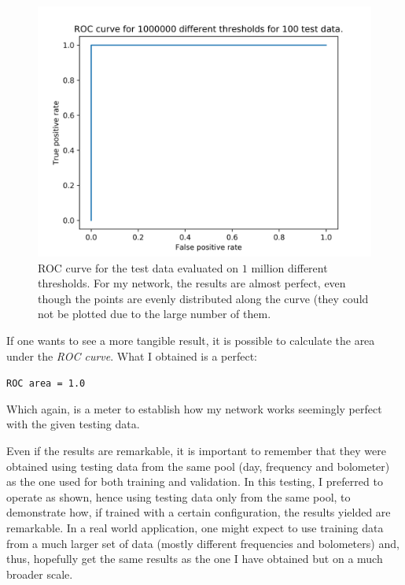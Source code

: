 \documentclass[12pt,a4paper,final]{book}			%
\begin{document}
				\begin{figure}[h!]
				\centering
					\includegraphics[scale=0.8]{figures/ROC.png}
					\caption{ROC curve for the test data evaluated on $1$ million different thresholds. For my network, the results are almost perfect, even though the points are evenly distributed along the curve (they could not be plotted due to the large number of them.}
					\label{fig:roc_curve}
				\end{figure}							
					 
				If one wants to see a more tangible result, it is possible to calculate the area under the \textit{ROC curve}. What I obtained is a perfect:
				\begin{center}
					\texttt{ROC area = 1.0}
				\end{center}
				Which again, is a meter to establish how my network works seemingly perfect with the given testing data.				
				
				Even if the results are remarkable, it is important to remember that they were obtained using testing data from the same pool (day, frequency and bolometer) as the one used for both training and validation. 
				In this testing, I preferred to operate as shown, hence using testing data only from the same pool, to demonstrate how, if trained with a certain configuration, the results yielded are remarkable. In a real world application, one might expect to use training data from a much larger set of data (mostly different frequencies and bolometers) and, thus, hopefully get the same results as the one I have obtained but on a much broader scale.				 
				
\end{document}
